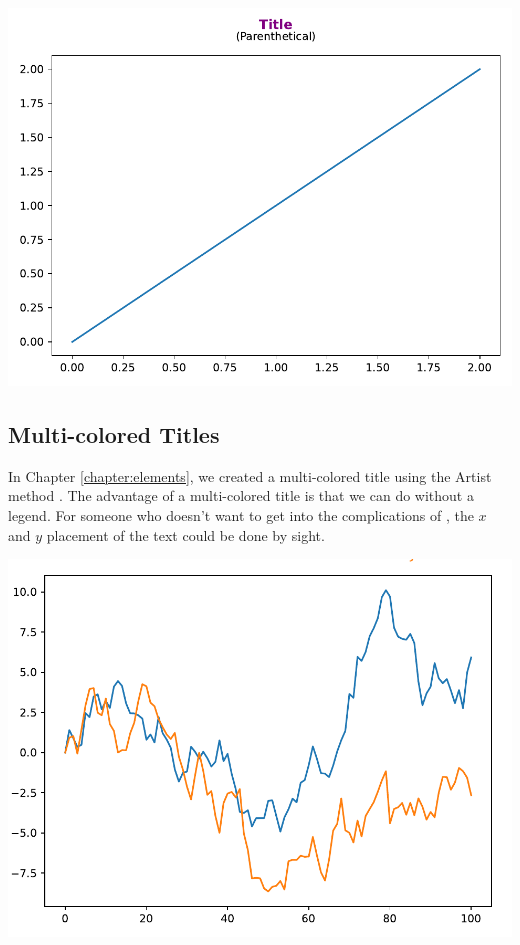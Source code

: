 
\begin{center}
    \includegraphics[width = .80\textwidth]{figures/proseplots/subtitle.pdf}
\end{center}


\subsection{Multi-colored Titles}


In Chapter \ref{chapter:elements}, we created a multi-colored title using the Artist method . The advantage of a multi-colored title is that we can do without a legend. For someone who doesn't want to get into the complications of , the $x$ and $y$ placement of the text could be done by sight. 


\begin{center}
    \includegraphics[width = .80\textwidth]{figures/proseplots/multicolor-inexact.pdf}
\end{center}

